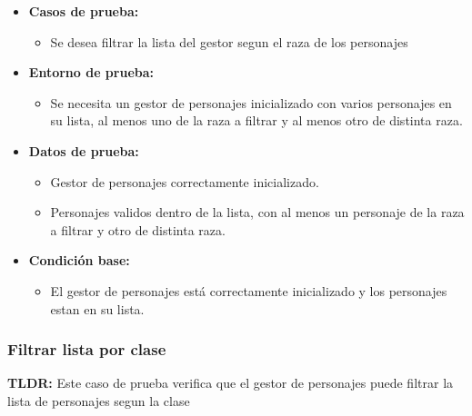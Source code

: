 \documentclass{article}
\begin{document}
\begin{itemize}
	\item \textbf{Casos de prueba:}
	\begin{itemize}
		\item Se desea filtrar la lista del gestor segun el raza de los personajes
	\end{itemize}
	
	\item \textbf{Entorno de prueba:}
	\begin{itemize}
		\item Se necesita un gestor de personajes inicializado con varios personajes en su lista, al menos uno de la raza a filtrar y al menos otro de distinta raza.
	\end{itemize}
	
	\item \textbf{Datos de prueba:}
	\begin{itemize}
		\item Gestor de personajes correctamente inicializado.
		\item Personajes validos dentro de la lista, con al menos un personaje de la raza a filtrar y otro de distinta raza.
	\end{itemize}
	
	\item \textbf{Condición base:}
	\begin{itemize}
		\item El gestor de personajes está correctamente inicializado y los personajes estan en su lista.
	\end{itemize}
	
\end{itemize}

\subsubsection{Filtrar lista por clase}
\textbf{TLDR:} Este caso de prueba verifica que el gestor de personajes puede filtrar la lista de personajes segun la clase 
\end{document}
